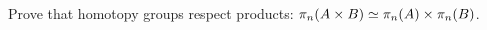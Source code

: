 \documentclass[hott-all.tex]{subfiles}
\begin{document}
% 
% 
% 
% 
% 
% 
% 
% 
% 
% 
\sectionExercises
% 
\begin{ex}
  Prove that homotopy groups respect products: $\pi_n(A\times B) \simeq \pi_n(A)\times \pi_n(B)$.
\end{ex}
\end{document}
